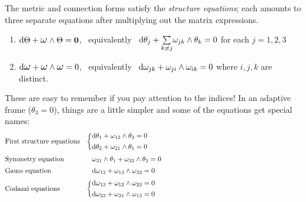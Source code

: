 \begin{thm}{}{}
	The metric and connection forms satisfy the \emph{structure equations}; each amounts to three separate equations after multiplying out the matrix expressions.
	\begin{enumerate}
	  \item $\D\Theta+\lomega\wedge\Theta=\V0$, \ equivalently \ $\mathrm{d}\theta_j+{\sum\limits_{k\neq j}}\omega_{jk}\wedge\theta_k=0$ for each $j=1,2,3$
	  \item $\D\lomega+\lomega\wedge\lomega=0$, \ equivalently \ $\mathrm{d}\omega_{jk}+\omega_{ji}\wedge\omega_{ik}=0$ where $i,j,k$ are distinct.
	\end{enumerate}
\end{thm}
These are easy to remember if you pay attention to the indices! In an adaptive frame ($\theta_3=0$), things are a little simpler and some of the equations get special names:
\begin{align*}
	&\text{First structure equations}
	&\bigg\{
	&\begin{array}{@{}c}
		\D\theta_1+\omega_{12}\wedge\theta_2=0\\[4pt]
		\D\theta_2+\omega_{21}\wedge\theta_1=0
	\end{array}
	\hspace{220pt}
	\\[2pt]
	&\text{Symmetry equation}
	&
	&\omega_{31}\wedge\theta_1+\omega_{32}\wedge\theta_2=0
	\\[2pt]
	&\text{Gauss equation}
	&
	&\D\omega_{12}+\omega_{13}\wedge\omega_{32}=0
	\\[2pt]
	&\text{Codazzi equations}
	&\bigg\{
	&\begin{array}{@{}c}
		\D\omega_{13}+\omega_{12}\wedge\omega_{23}=0\\[4pt]
		\D\omega_{23}+\omega_{21}\wedge\omega_{13}=0
	\end{array}
\end{align*}

\goodbreak


